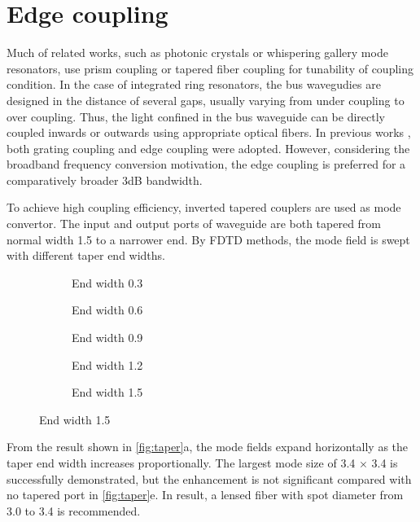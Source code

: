 \section{Edge coupling}
Much of related works, such as photonic crystals or whispering gallery mode resonators, use prism coupling or tapered fiber coupling for tunability of coupling condition. 
In the case of integrated ring resonators, the bus wavegudies are designed in the distance of several gaps, usually varying from under coupling to over coupling. 
Thus, the light confined in the bus waveguide can be directly coupled inwards or outwards using appropriate optical fibers. 
In previous works \cite{Sunada2018}, both grating coupling and edge coupling were adopted. However, considering the broadband frequency conversion motivation, the edge coupling is preferred for a comparatively broader 3dB bandwidth.

To achieve high coupling efficiency, inverted tapered couplers are used as mode convertor. The input and output ports of waveguide are both tapered from normal width 1.5 \um to a narrower end. By FDTD methods, the mode field is swept with different taper end widths.

\begin{figure}
	\centering
	\begin{subfigure}[b]{0.33\textwidth}
		
		\caption{End width 0.3 \um}
	\end{subfigure}\hfill
	\begin{subfigure}[b]{0.33\textwidth}
		
		\caption{End width 0.6 \um}
	\end{subfigure}\hfill
	\begin{subfigure}[b]{0.33\textwidth}
		
		\caption{End width 0.9 \um}
	\end{subfigure}
	\vfill
	\begin{subfigure}[b]{0.33\textwidth}
		
		\caption{End width 1.2 \um}
	\end{subfigure}
	\begin{subfigure}[b]{0.33\textwidth}
		
		\caption{End width 1.5 \um}
	\end{subfigure}
	\label{fig:taper}
\end{figure}

From the result shown in \autoref{fig:taper}a, the mode fields expand horizontally as the taper end width increases proportionally. The largest mode size of 3.4 \um $\times$ 3.4 \um is successfully demonstrated, but the enhancement is not significant compared with no tapered port in \autoref{fig:taper}e. In result, a lensed fiber with spot diameter from 3.0 \um  to 3.4 \um  is recommended. 



